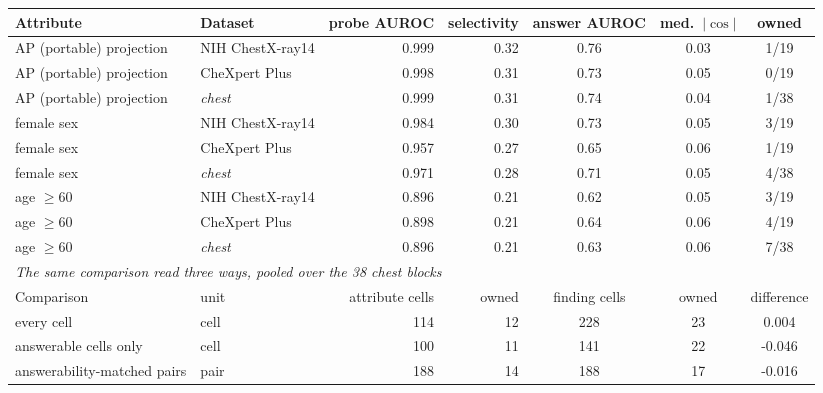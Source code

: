 \documentclass{article}
\begin{document}
\begin{table}[htbp]
{{{\begin{tabular}{llrrccc}
Attribute & Dataset & probe AUROC & selectivity & answer AUROC & med.\ $|\cos|$ & owned \\
\midrule
AP (portable) projection & NIH ChestX-ray14 & 0.999 & 0.32 & 0.76 & 0.03 & 1/19 \\
AP (portable) projection & CheXpert Plus & 0.998 & 0.31 & 0.73 & 0.05 & 0/19 \\
AP (portable) projection & \textit{chest} & 0.999 & 0.31 & 0.74 & 0.04 & 1/38 \\
female sex & NIH ChestX-ray14 & 0.984 & 0.30 & 0.73 & 0.05 & 3/19 \\
female sex & CheXpert Plus & 0.957 & 0.27 & 0.65 & 0.06 & 1/19 \\
female sex & \textit{chest} & 0.971 & 0.28 & 0.71 & 0.05 & 4/38 \\
age $\geq60$ & NIH ChestX-ray14 & 0.896 & 0.21 & 0.62 & 0.05 & 3/19 \\
age $\geq60$ & CheXpert Plus & 0.898 & 0.21 & 0.64 & 0.06 & 4/19 \\
age $\geq60$ & \textit{chest} & 0.896 & 0.21 & 0.63 & 0.06 & 7/38 \\
\midrule
\multicolumn{7}{l}{\textit{The same comparison read three ways, pooled over the 38 chest blocks}} \\
Comparison & unit & attribute cells & owned & finding cells & owned & difference \\
\midrule
every cell & cell & 114 & 12 & 228 & 23 & 0.004 \\
answerable cells only & cell & 100 & 11 & 141 & 22 & -0.046 \\
answerability-matched pairs & pair & 188 & 14 & 188 & 17 & -0.016 \\
\bottomrule
\end{tabular}}}
}
\end{table}
\end{document}
